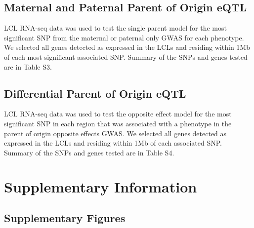 \subsection{Maternal and Paternal Parent of Origin eQTL}\label{Maternal and Paternal Parent of Origin Parent of Origin eQTL}

LCL RNA-seq data was used to test the single parent model for the most significant SNP from the maternal or paternal only GWAS for each phenotype. We selected all genes detected as expressed in the LCLs and residing within 1Mb of each most significant associated SNP. Summary of the SNPs and genes tested are in Table S3.

\subsection{Differential Parent of Origin eQTL}\label{Differential Parent of Origin eQTL}

LCL RNA-seq data was used to test the opposite effect model for the most significant SNP in each region that was associated with a phenotype in the parent of origin opposite effects GWAS. We selected all genes detected as expressed in the LCLs and residing within 1Mb of each associated SNP. Summary of the SNPs and genes tested are in Table S4.

\clearpage
\section{Supplementary Information}\label{fig-supplementary-information}

\subsection{Supplementary Figures}\label{fig-supplementary-figures}
\renewcommand\theContinuedFloat{\alph{ContinuedFloat}}
 
